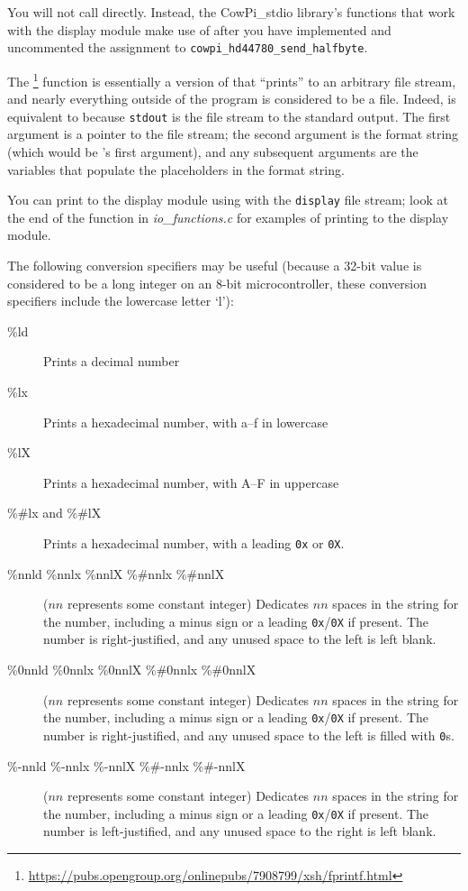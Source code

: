You will not call  directly.
Instead, the CowPi\_stdio library's functions that work with the display module make use of  after you have implemented and uncommented the assignment to \lstinline{cowpi_hd44780_send_halfbyte}.

The \footnote{\url{https://pubs.opengroup.org/onlinepubs/7908799/xsh/fprintf.html}} function is essentially a version of  that ``prints'' to an arbitrary file stream,
and nearly everything outside of the program is considered to be a file.
Indeed,  is equivalent to  because \lstinline{stdout} is the file stream to the standard output.
The first argument is a pointer to the file stream; the second argument is the format string (which would be 's first argument), and any subsequent arguments are the variables that populate the placeholders in the format string.

You can print to the display module using  with the \lstinline{display} file stream;
look at the end of the  function in \textit{io\_functions.c} for examples of printing to the display module.

The following conversion specifiers may be useful (because a 32-bit value is considered to be a long integer on an 8-bit microcontroller, these conversion specifiers include the lowercase letter `l'):
\begin{description}
    \item[\%ld] Prints a decimal number
    \item[\%lx] Prints a hexadecimal number, with a--f in lowercase
    \item[\%lX] Prints a hexadecimal number, with A--F in uppercase
    \item[\%\#lx and \%\#lX] Prints a hexadecimal number, with a leading \lstinline{0x} or \lstinline{0X}.
    \item[\%nnld \%nnlx \%nnlX \%\#nnlx \%\#nnlX] ($nn$ represents some constant integer) Dedicates $nn$ spaces in the string for the number, including a minus sign or a leading \lstinline{0x}/\lstinline{0X} if present.
        The number is right-justified, and any unused space to the left is left blank.
    \item[\%0nnld \%0nnlx \%0nnlX \%\#0nnlx \%\#0nnlX] ($nn$ represents some constant integer) Dedicates $nn$ spaces in the string for the number, including a minus sign or a leading \lstinline{0x}/\lstinline{0X} if present.
        The number is right-justified, and any unused space to the left is filled with \lstinline{0}s.
    \item[\%-nnld \%-nnlx \%-nnlX \%\#-nnlx \%\#-nnlX] ($nn$ represents some constant integer) Dedicates $nn$ spaces in the string for the number, including a minus sign or a leading \lstinline{0x}/\lstinline{0X} if present.
        The number is left-justified, and any unused space to the right is left blank.
\end{description}


